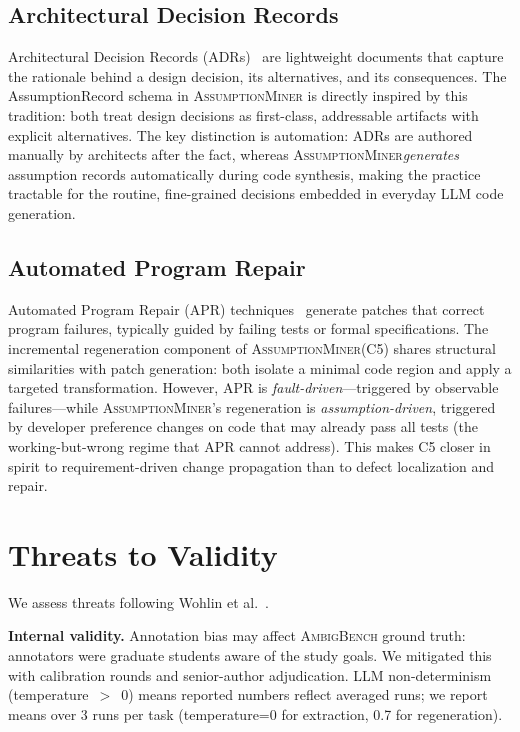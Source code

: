 \documentclass[sigconf,review,anonymous]{acmart}
\newcommand{\sysname}{\textsc{AssumptionMiner}\xspace}
\newcommand{\benchname}{\textsc{AmbigBench}\xspace}
\begin{document}
\subsection{Architectural Decision Records}
Architectural Decision Records (ADRs)~\cite{jansen2005adr,capilla2016adr}
are lightweight documents that capture the rationale behind a design decision,
its alternatives, and its consequences.
The AssumptionRecord schema in \sysname is directly inspired by this tradition:
both treat design decisions as first-class, addressable artifacts with explicit
alternatives.
The key distinction is automation: ADRs are authored manually by architects
after the fact, whereas \sysname \emph{generates} assumption records
automatically during code synthesis, making the practice tractable for the
routine, fine-grained decisions embedded in everyday LLM code generation.

\subsection{Automated Program Repair}
Automated Program Repair (APR) techniques~\cite{yuan2022avatar,chen2018sequencer,ye2022rewardrepair}
generate patches that correct program failures, typically guided by failing
tests or formal specifications.
The incremental regeneration component of \sysname (C5) shares structural
similarities with patch generation: both isolate a minimal code region and
apply a targeted transformation.
However, APR is \emph{fault-driven}---triggered by observable failures---while
\sysname's regeneration is \emph{assumption-driven}, triggered by developer
preference changes on code that may already pass all tests (the working-but-wrong
regime that APR cannot address).
This makes C5 closer in spirit to requirement-driven change propagation than
to defect localization and repair.

\section{Threats to Validity}
\label{sec:threats}

We assess threats following Wohlin et al.~\cite{wohlin2012experimentation}.

\textbf{Internal validity.}
Annotation bias may affect \benchname ground truth: annotators were graduate
students aware of the study goals.  We mitigated this with calibration rounds and
senior-author adjudication.
LLM non-determinism (temperature~$>$~0) means reported numbers reflect averaged
runs; we report means over 3 runs per task (temperature=0 for extraction, 0.7 for regeneration).
\end{document}
